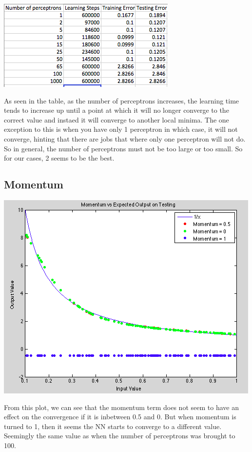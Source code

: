 \documentclass[epsfig]{article}
\begin{document}
\begin{center}
\includegraphics[scale=0.7]{pic5}
\end{center}
As seen in the table, as the number of perceptrons increases, the learning time tends to increase up until a point at which it will no longer converge to the correct value and instaed it will converge to another local minima. The one exception to this is when you have only 1 perceptron in which case, it will not converge, hinting that there are jobs that where only one perceptron will not do. So in general, the number of perceptrons must not be too large or too small. So for our cases, 2 seems to be the best.
\subsection*{Momentum}
 \begin{center}
 \includegraphics[scale=0.6]{pic6}
 \end{center}
 From this plot, we can see that the momentum term does not seem to have an effect on the convergence if it is inbetween 0.5 and 0. But when momentum is turned to 1, then it seems the NN starts to converge to a different value. Seemingly the same value as when the number of perceptrons was brought to 100.
 
\end{document}

